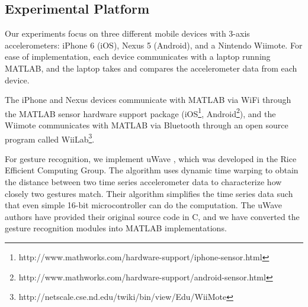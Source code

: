 
\subsection{Experimental Platform}
\label{sec:Tooling}

Our experiments focus on three different mobile devices with 3-axis accelerometers: iPhone 6 (iOS), Nexus 5 (Android), and a Nintendo Wiimote. For ease of implementation, each device communicates with a laptop running MATLAB, and the laptop takes and compares the accelerometer data from each device. 

The iPhone and Nexus devices communicate with MATLAB via WiFi through the MATLAB sensor hardware support package (iOS\footnote{http://www.mathworks.com/hardware-support/iphone-sensor.html}, Android\footnote{http://www.mathworks.com/hardware-support/android-sensor.html}), and the Wiimote communicates with MATLAB via Bluetooth through an open source program called WiiLab\footnote{http://netscale.cse.nd.edu/twiki/bin/view/Edu/WiiMote}. 

For gesture recognition, we implement uWave \cite{Liu:2009, LiuuWave}, which was developed in the Rice Efficient Computing Group. The algorithm uses dynamic time warping to obtain the distance between two time series accelerometer data to characterize how closely two gestures match. Their algorithm simplifies the time series data such that even simple 16-bit microcontroller can do the computation. The uWave authors have provided their original source code in C, and we have converted the gesture recognition modules into MATLAB implementations.
